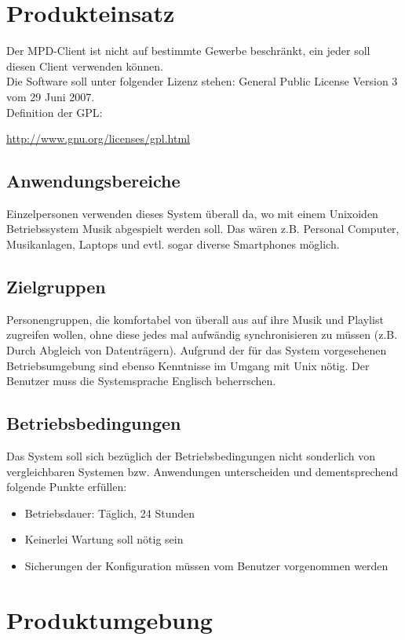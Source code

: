 \section{Produkteinsatz}
Der MPD-Client ist nicht auf bestimmte Gewerbe beschränkt, ein jeder soll diesen Client
verwenden können. \\
Die Software soll unter folgender Lizenz stehen:
General Public License Version 3 vom 29 Juni 2007.\ \\ 
Definition der GPL:
\begin{center}
    \url{http://www.gnu.org/licenses/gpl.html}
\end{center}
\subsection{Anwendungsbereiche}
Einzelpersonen verwenden dieses System überall da, wo mit
einem Unixoiden Betriebssystem Musik abgespielt werden soll.
Das wären z.B. Personal Computer, Musikanlagen, Laptops und evtl.
sogar diverse Smartphones möglich.

\subsection{Zielgruppen}
Personengruppen, die komfortabel von überall aus auf ihre Musik und Playlist zugreifen
wollen, ohne diese jedes mal aufwändig synchronisieren zu müssen (z.B. Durch Abgleich von Datenträgern). 
Aufgrund der für das System vorgesehenen Betriebsumgebung sind ebenso Kenntnisse im Umgang mit Unix nötig. 
Der Benutzer muss die Systemsprache Englisch beherrschen.


\subsection{Betriebsbedingungen}
Das System soll sich bezüglich der Betriebsbedingungen nicht sonderlich von vergleichbaren Systemen bzw.
Anwendungen unterscheiden und dementsprechend folgende Punkte erfüllen:
\begin{itemize}
        \item Betriebsdauer: Täglich, 24 Stunden
        \item Keinerlei Wartung soll nötig sein
        \item Sicherungen der Konfiguration müssen vom Benutzer vorgenommen werden
\end{itemize}

\section{Produktumgebung}
